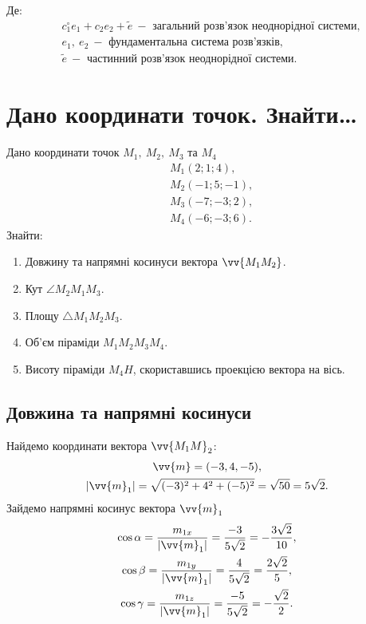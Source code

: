 Де:
\begin{align}
	&c_1^\circ e_1+c_2e_2+\tilde{e}\ - \text{ загальний розв'язок неоднорідної системи},\\
	&e_1,\ e_2\ - \text{ фундаментальна система розв'язків},\\
	&\tilde{e}\ - \text{ частинний розв'язок неоднорідної системи}.
\end{align}

\section{Дано координати точок. Знайти\dots}
Дано координати точок \(M_1,\ M_2,\ M_3\) та \(M_4\)
\begin{align}
	&M_1(2;1;4),\\
	&M_2(-1;5;-1),\\
	&M_3(-7;-3;2),\\
	&M_4(-6;-3;6).
\end{align}
Знайти:
\begin{enumerate}
	\item Довжину та напрямні косинуси вектора \(\vv{M_1M_2}\).
	\item Кут \(\angle M_2M_1M_3\).
	\item Площу \(\triangle M_1M_2M_3\).
	\item Об'єм піраміди \(M_1M_2M_3M_4\).
	\item Висоту піраміди \(M_4H\), скориставшись проекцією вектора на вісь.
\end{enumerate}
\subsection{Довжина та напрямні косинуси}
\solving
Найдемо координати вектора \(\vv{M_1M}_2\):
\begin{gather}
	\vv{m}=(-3,4,-5),\\
	\lvert\vv{m}_1\rvert=\sqrt{(-3)^2+4^2+(-5)^2}=\sqrt{50}=5\sqrt{2}.\\
\end{gather}
Зайдемо напрямні косинус вектора \(\vv{m}_1\)
\begin{gather}
	\cos\alpha=\frac{m_{1x}}{\lvert\vv{m}_1\rvert}=\frac{-3}{5\sqrt{2}}=-\frac{3\sqrt{2}}{10},\\
	\cos\beta=\frac{m_{1y}}{\lvert\vv{m}_1\rvert}=\frac{4}{5\sqrt{2}}=\frac{2\sqrt{2}}{5},\\
	\cos\gamma=\frac{m_{1z}}{\lvert\vv{m}_1\rvert}=\frac{-5}{5\sqrt{2}}=-\frac{\sqrt{2}}{2}.
\end{gather}
